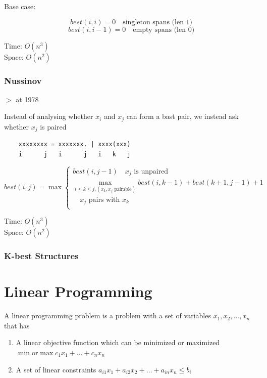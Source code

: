 \documentclass[12pt,a4paper]{article}
\newcommand{\remark}[1]{
    {\small $>$ {\color{blue} #1}}
}
\begin{document}
Base case:

\[best(i,i) = 0 \quad \text{singleton spans (len 1)}\]
\[best(i,i-1) = 0 \quad \text{empty spans (len 0)}\]

Time: \(O(n^3)\)\\
Space: \(O(n^2)\)

\subsubsection*{Nussinov}

\remark{at 1978}

Instead of analysing whether $x_i$ and $x_j$ can form a bast pair, 
we instead ask whether $x_j$ is paired

\begin{verbatim}
    xxxxxxxx = xxxxxxx. | xxxx(xxx)
    i      j   i      j   i   k   j
\end{verbatim}

\[
best(i, j) = \max \left\{
\begin{array}{l}
    best(i, j - 1) \quad \text{$x_j$ is unpaired} \\
    \max_{i \leq k \leq j,(\text{$x_k,x_j$ pairable})} best(i, k-1) + best(k + 1, j-1) + 1 \\
    \quad \text{$x_j$ pairs with $x_k$} \\
\end{array}
\right.
\]

Time: \(O(n^3)\)\\
Space: \(O(n^2)\)

\subsubsection*{K-best Structures}


\section*{Linear Programming}

A linear programming problem is a problem with a set of variables \(x_1, x_2, \dots, x_n\) that has

\begin{enumerate}
    \item A linear objective function which can be minimized or maximized \\ 
            \(\min \text{or} \max c_1x_1+\dots+c_nx_n\)
    \item A set of linear constraints \(a_{i1}x_1 + a_{i2}x_2 + \dots + a_{in}x_n \leq b_i\) 
\end{enumerate}
\end{document}

